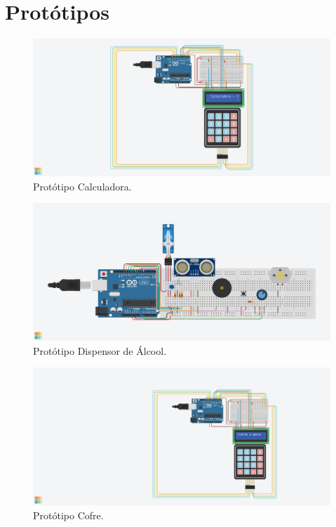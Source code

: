\documentclass[conference]{IEEEtran}
\begin{document}
\section{Protótipos}
    \begin{figure}[h]
        \centering
        \includegraphics[scale = 0.1]{calculadora.png}
        \caption{Protótipo Calculadora.}
        \label{Calculadora}
    \end{figure}

    \begin{figure}[h]
        \centering
        \includegraphics[scale = 0.1]{dispenser.png}
        \caption{Protótipo Dispensor de Álcool.}
        \label{Calculadora}
    \end{figure}

    \begin{figure}[h]
        \centering
        \includegraphics[scale = 0.1]{cofre.png}
        \caption{Protótipo Cofre.}
        \label{Calculadora}
    \end{figure}
\end{document}
